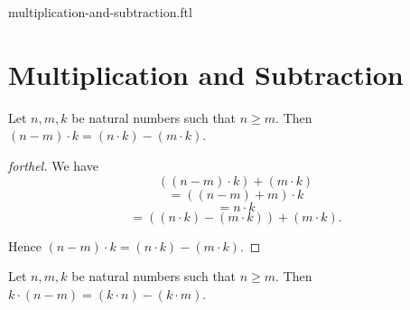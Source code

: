 \documentclass{naproche-library}
\begin{document}
\begin{smodule}{multiplication-and-subtraction.ftl}

  \section*{Multiplication and Subtraction}

  \begin{proposition}[forthel,id=ARITHMETIC_06_5458841930039296]
    Let $n, m, k$ be natural numbers such that $n \geq m$.
    Then $(n - m) \cdot k = (n \cdot k) - (m \cdot k)$.
  \end{proposition}
  \begin{proof}[forthel]
    We have
    \[  ((n - m) \cdot k) + (m \cdot k)                 \]
    \[    = ((n - m) + m) \cdot k                       \]
    \[    = n \cdot k                                   \]
    \[    = ((n \cdot k) - (m \cdot k)) + (m \cdot k).  \]

    Hence $(n - m) \cdot k = (n \cdot k) - (m \cdot k)$.
  \end{proof}

  \begin{corollary}[forthel,id=ARITHMETIC_06_8461123277815808]
    Let $n, m, k$ be natural numbers such that $n \geq m$.
    Then $k \cdot (n - m) = (k \cdot n) - (k \cdot m)$.
  \end{corollary}
\end{smodule}
\end{document}
